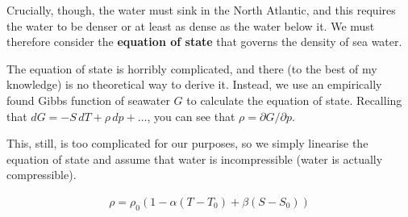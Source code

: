 Crucially, though, the water must sink in the North Atlantic, and this requires the water to be denser or at least as dense as the water below it. We must therefore consider the \textbf{equation of state} that governs the density of sea water.

The equation of state is horribly complicated, and there (to the best of my knowledge) is no theoretical way to derive it. Instead, we use an empirically found Gibbs function of seawater $G$ to calculate the equation of state. Recalling that $dG = -S\,dT + \rho\,dp+\dots$, you can see that $\rho=\partial G/\partial p$.

This, still, is too complicated for our purposes, so we simply linearise the equation of state and assume that water is incompressible (water is actually compressible).

\begin{gather}
    \rho=\rho_0(1-\alpha (T-T_0)+\beta(S-S_0))
\end{gather}